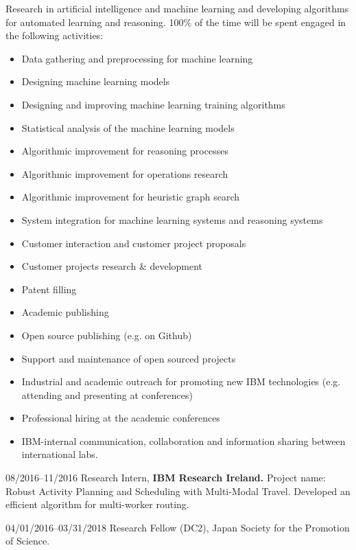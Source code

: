 \begin{CV}
 Research in artificial intelligence and machine learning and developing algorithms for automated learning and reasoning.
 100\% of the time will be spent engaged in the following activities:

\begin{itemize}
 \item Data gathering and preprocessing for machine learning
 \item Designing machine learning models
 \item Designing and improving machine learning training algorithms
 \item Statistical analysis of the machine learning models
 \item Algorithmic improvement for reasoning processes
 \item Algorithmic improvement for operations research
 \item Algorithmic improvement for heuristic graph search
 \item System integration for machine learning systems and reasoning systems
 \item Customer interaction and customer project proposals
 \item Customer projects research \& development
 \item Patent filling
 \item Academic publishing
 \item Open source publishing (e.g. on Github)
 \item Support and maintenance of open sourced projects
 \item Industrial and academic outreach for promoting new IBM technologies (e.g. attending and presenting at conferences)
 \item Professional hiring at the academic conferences
 \item IBM-internal communication, collaboration and information sharing between international labs.
\end{itemize}

\item[08/2016--11/2016] Research Intern, \textbf{IBM Research Ireland.}
 Project name: Robust Activity Planning and Scheduling with Multi-Modal Travel.
 Developed an efficient algorithm for multi-worker routing.

\item[04/01/2016--03/31/2018] Research Fellow (DC2), Japan Society for the Promotion of Science.


\end{CV}
